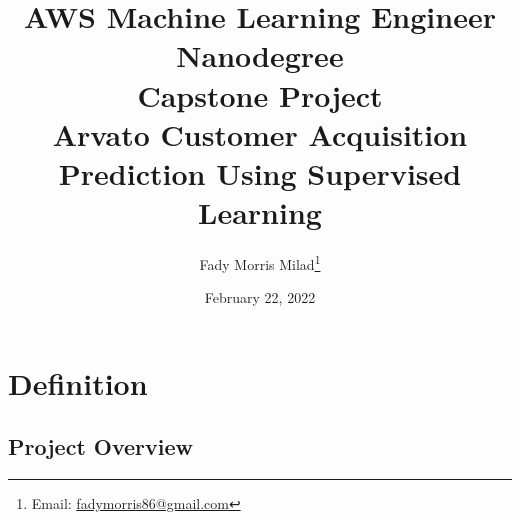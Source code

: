 \documentclass[a4paper]{article}
\title{
  \bfseries AWS Machine Learning Engineer Nanodegree \\
  Capstone Project \\
  Arvato Customer Acquisition Prediction Using Supervised Learning
}
\author{Fady Morris Milad\thanks{Email: \href{mailto:fadymorris86@gmail.com}{fadymorris86@gmail.com}}}
\begin{document}


  \date{February 22, 2022} %

  {
    \makeatletter
    \addtocounter{footnote}{1} %
    \renewcommand\thefootnote{\@fnsymbol\c@footnote}%
    \makeatother
    \maketitle
  }
  \newpage
  \tableofcontents
  \newpage

  \section{Definition}
  \subsection{Project Overview}
\end{document}
